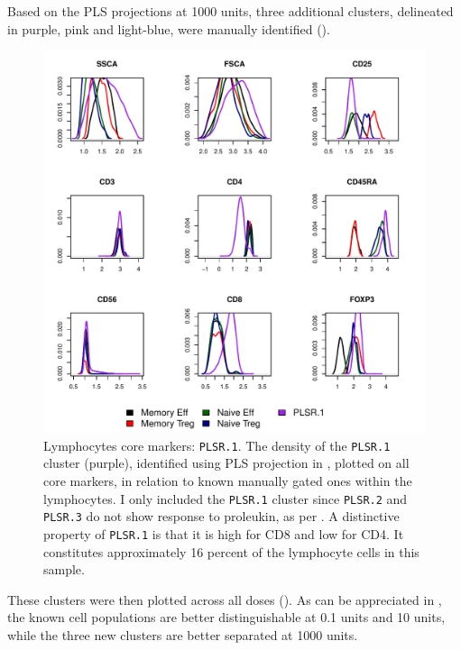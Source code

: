 Based on the \gls{PLS} projections at 1000 units, three additional clusters, delineated in purple, pink and light-blue, were manually identified
().
\begin{figure}[!h]
\centering
\includegraphics[scale=.7]{figures/plsr-lymphocytes-clusters}
{ Lymphocytes core markers: \texttt{PLSR.1}. }
{
    The density of the \texttt{PLSR.1} cluster (purple), identified using \gls{PLS} projection in ,
    plotted  on all core markers, in relation to known manually gated ones within the lymphocytes.
    I only included the \texttt{PLSR.1} cluster since \texttt{PLSR.2} and \texttt{PLSR.3} do not show response to proleukin, as per .
    A distinctive property of \texttt{PLSR.1} is that it is high for CD8 and low for CD4.
    It constitutes approximately 16 percent of the lymphocyte cells in this sample.
}
\end{figure}
These clusters were then plotted across all doses ().
As can be appreciated in , the known cell populations are better distinguishable at 0.1 units and 10 units, while the three new clusters are better separated at 1000 units.
